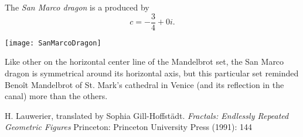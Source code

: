 \documentclass[12pt]{article}
\begin{document}
The {\em San Marco dragon} is a  produced by $$c = -\frac{3}{4} + 0i.$$

\begin{center}
\texttt{[image: SanMarcoDragon]}
\end{center}

Like other  on the horizontal center line of the Mandelbrot set, the San Marco dragon is symmetrical around its horizontal axis, but this particular set reminded Beno\^it Mandelbrot of St. Mark's cathedral in Venice (and its reflection in the canal) more than the others.

\begin{thebibliography}{1}
 H. Lauwerier, translated by Sophia Gill-Hoffst\"adt. {\it Fractals: Endlessly Repeated Geometric Figures} Princeton: Princeton University Press (1991): 144
\end{thebibliography}
\end{document}
